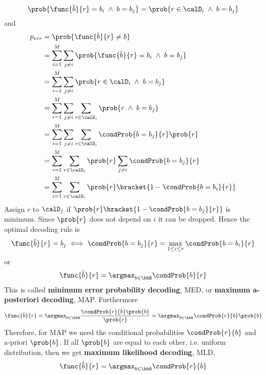 \begin{description}
    \begin{equation*}
        \prob{\func{\hat{b}}{r} = b_i \; \land \; b = b_j} = \prob{r \in \calD_i \; \land \; b = b_j}
    \end{equation*}
    and 
    \begin{align*}
        p_{err} &= \prob{\func{\hat{b}}{r} \neq b}\\
        &= \sum_{i = 1}^M \sum_{j \neq i} \prob{\func{\hat{b}}{r} = b_i \; \land \; b = b_j}\\
        &= \sum_{i = 1}^M \sum_{j \neq i} \prob{r \in \calD_i \; \land \; b = b_j}\\
        &= \sum_{i = 1}^M \sum_{j \neq i} \sum_{r \in \calD_i} \prob{r \; \land \; b = b_j}\\
        &= \sum_{i = 1}^M \sum_{j \neq i} \sum_{r \in \calD_i} \condProb{b = b_j}{r} \prob{r}\\
        &= \sum_{i = 1}^M  \sum_{r \in \calD_i}\prob{r} \sum_{j \neq i}\condProb{b = b_j}{r} \\
        &=\sum_{i = 1}^M  \sum_{r \in \calD_i}\prob{r} \bracket{1 - \condProb{b = b_i}{r} }
    \end{align*}
    Assign \(r\) to \(\calD_j\) if \(\prob{r} \bracket{1 - \condProb{b = b_j}{r} }\) is minimum. Since \(\prob{r}\) does not depend on \(i\) it can be dropped. Hence the optimal decoding rule is 
    \begin{equation*}
        \func{\hat{b}}{r} = b_j \iff \condProb{b = b_j}{r} = \max_{1 \leq i \leq r} \condProb{b = b_i}{r} 
    \end{equation*}
    or 
    \begin{equation*}
        \func{\hat{b}}{r} = \argmax_{b \in \bbB} \condProb{b}{r} 
    \end{equation*}
    This is called \textbf{minimum error probability decoding}, MED, or \textbf{maximum a-posteriori decoding}, MAP. Furthermore
    \begin{equation*}
        \func{\hat{b}}{r} = \argmax_{b \in \bbB} \dfrac{\condProb{r}{b} \prob{b}}{\prob{r}} = \argmax_{b \in \bbB} \condProb{r}{b} \prob{b}
    \end{equation*}
    Therefore, for MAP we need the conditional probabilities \(\condProb{r}{b}\) and a-priori \(\prob{b}\). If all \(\prob{b}\) are equal to each other, i.e. uniform distribution, then we get \textbf{maximum likelihood decoding}, MLD, 
    \begin{equation*}
        \func{\hat{b}}{r} =  \argmax_{b \in \bbB} \condProb{r}{b} 
    \end{equation*}
\end{description}
